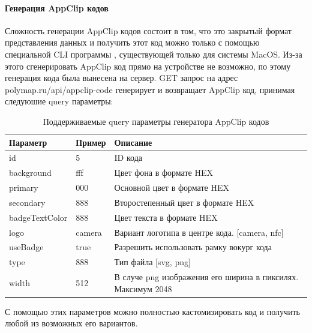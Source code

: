     \paragraph{Генерация AppClip кодов}
      Сложность генерации AppClip кодов состоит в том, что это закрытый формат представления данных и получить этот код можно только с помощью специальной CLI программы \cite{AppClipGenerator}, существующей только для системы MacOS. Из-за этого сгенерировать AppClip код прямо на устройстве не возможно, по этому генерация кода была вынесена на сервер. GET запрос на адрес polymap.ru/api/appclip-code генерирует и возвращает AppClip код, принимая следуюшие query параметры:
      \begin{center}
        \begin{xltabular}{\linewidth}{|l|p{3cm}|X|}
          \caption{Поддерживаемые query параметры генератора AppClip кодов}\\\hline
          Параметр       & Пример & Описание                                                     \\ \hline
          id             & 5      & ID кода                                                      \\ \hline
          background     & fff    & Цвет фона в формате HEX                                      \\ \hline
          primary        & 000    & Основной цвет в формате HEX                                  \\ \hline
          secondary      & 888    & Второстепенный цвет в формате HEX                            \\ \hline
          badgeTextColor & 888    & Цвет текста в формате HEX                                    \\ \hline
          logo           & camera & Вариант логотипа в центре кода. [camera, nfc]                 \\ \hline
          useBadge       & true   & Разрешить использовать рамку вокург кода                     \\ \hline
          type           & 888    & Тип файла [svg, png]                                         \\ \hline
          width          & 512    & В случе png изображения его ширина в пиксилях. Максимум 2048 \\ \hline
        \end{xltabular}
      \end{center}


      С помощью этих параметров можно полностью кастомизировать код и получить любой из возможных его вариантов.

